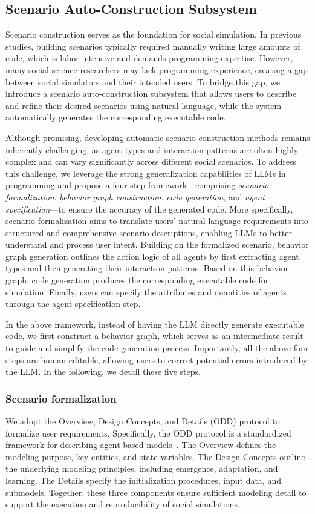 \documentclass{article}
\theoremstyle{definition}
\theoremstyle{theorem}
\theoremstyle{proof}
\theoremstyle{remark}
\begin{document}
    \subsection{Scenario Auto-Construction Subsystem}
    Scenario construction serves as the foundation for social simulation. In previous studies, building scenarios typically required manually writing large amounts of code, which is labor-intensive and demands programming expertise.
    However, many social science researchers may lack programming experience, creating a gap between social simulators and their intended users.
    To bridge this gap, we introduce a scenario auto-construction subsystem that allows users to describe and refine their desired scenarios using natural language, while the system automatically generates the corresponding executable code.


    Although promising, developing automatic scenario construction methods remains inherently challenging, as agent types and interaction patterns are often highly complex and can vary significantly across different social scenarios.
    To address this challenge, we leverage the strong generalization capabilities of LLMs in programming and propose a four-step framework—comprising \textit{scenario formalization}, \textit{behavior graph construction}, \textit{code generation}, and \textit{agent specification}—to ensure the accuracy of the generated code. 
    More specifically, scenario formalization aims to translate users' natural language requirements into structured and comprehensive scenario descriptions, enabling LLMs to better understand and process user intent. 
    Building on the formalized scenario, behavior graph generation outlines the action logic of all agents by first extracting agent types and then generating their interaction patterns.
    Based on this behavior graph, code generation produces the corresponding executable code for simulation.
    Finally, users can specify the attributes and quantities of agents through the agent specification step.
    
    In the above framework, instead of having the LLM directly generate executable code, we first construct a behavior graph, which serves as an intermediate result to guide and simplify the code generation process. Importantly, all the above four steps are human-editable, allowing users to correct potential errors introduced by the LLM.
    In the following, we detail these five steps.

    \subsubsection{Scenario formalization}
    We adopt the Overview, Design Concepts, and Details (ODD) protocol to formalize user requirements. Specifically, the ODD protocol is a standardized framework for describing agent-based models~\cite{grimm2010odd}. The Overview defines the modeling purpose, key entities, and state variables. The Design Concepts outline the underlying modeling principles, including emergence, adaptation, and learning. The Details specify the initialization procedures, input data, and submodels. Together, these three components ensure sufficient modeling detail to support the execution and reproducibility of social simulations.
\end{document}
